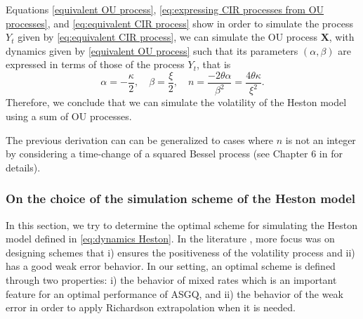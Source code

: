 Equations \eqref{equivalent OU process}, \eqref{eq:expressing CIR processes from OU processes}, and \eqref{eq:equivalent CIR process} show  in order to simulate the process $Y_t$ given by \eqref{eq:equivalent CIR process}, we can  simulate the  OU process  $\mathbf{X}$, with dynamics given by \eqref{equivalent OU process} such that its parameters $(\alpha, \beta)$ are expressed in terms of  those of the  process $Y_t$, that is 
$$ \alpha=-\frac{\kappa}{2},\quad \beta=\frac{\xi}{2}, \quad n=\frac{-2 \theta \alpha}{\beta^2}=\frac{4 \theta  \kappa}{\xi^2}.$$ Therefore, we conclude that we can simulate the volatility of the Heston model using a sum of OU processes.

\begin{remark}
The previous derivation can can be generalized to cases where $n$ is not an integer by considering a time-change of a squared Bessel process (see Chapter 6 in \cite{jeanblanc2009mathematical} for details). 
\end{remark}

\subsubsection{On the choice of the simulation scheme of the Heston model}\label{sec:On the choice of the simulation scheme of the Heston model}
In this section, we try to determine the optimal  scheme for simulating the Heston model defined in \ref{eq:dynamics Heston}.  In the literature  \cite{andersen2007efficient, lord2010comparison,alfonsi2010high}, more focus was on designing schemes that i) ensures the positiveness  of the volatility process and ii) has a good weak error behavior. In our setting, an optimal scheme is defined through two properties: i) the behavior of mixed rates which is an important feature for an  optimal performance of ASGQ, and  ii) the behavior of the weak error in order to apply Richardson extrapolation when it is needed. 
